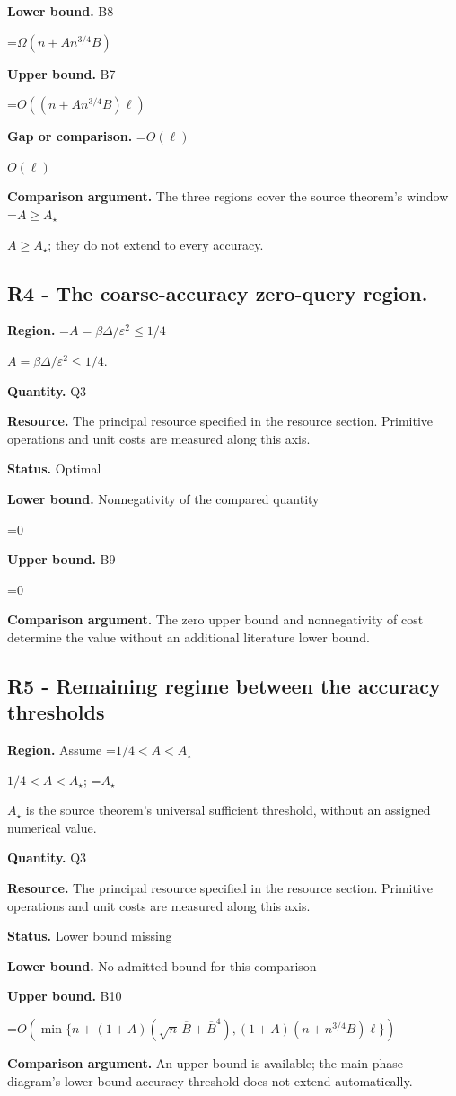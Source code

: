 \documentclass[10pt,a4paper]{article}
\newcommand{\AtlasMath}[1]{\par\begingroup\centering\setbox0=\hbox{$\displaystyle #1$}\ifdim\wd0>1.4\linewidth\typeout{ATLAS WIDE FORMULA: \the\wd0}\fi\ifdim\wd0>\linewidth\resizebox{\linewidth}{!}{\box0}\else\box0\fi\par\endgroup}
\newcommand{\AtlasInlineMath}[1]{\begingroup\setbox0=\hbox{$#1$}\ifdim\wd0>.4\linewidth\endgroup\AtlasMath{#1}\else\endgroup$#1$\fi}
\begin{document}
\textbf{Lower bound.} B8

\AtlasMath{\Omega(n+An^{3/4}B)}
\textbf{Upper bound.} B7

\AtlasMath{O\!\left((n+An^{3/4}B)\ell\right)}
\textbf{Gap or comparison.} \AtlasInlineMath{O(\ell)}

\textbf{Comparison argument.} The three regions cover the source theorem's window \AtlasInlineMath{A\ge A_\star}; they do not extend to every accuracy.

\subsection{R4 - The coarse-accuracy zero-query region.}
\textbf{Region.} \AtlasInlineMath{A=\beta\Delta/\varepsilon^2\le1/4}.

\textbf{Quantity.} Q3

\textbf{Resource.} The principal resource specified in the resource section. Primitive operations and unit costs are measured along this axis.

\textbf{Status.} Optimal

\textbf{Lower bound.} Nonnegativity of the compared quantity

\AtlasMath{0}
\textbf{Upper bound.} B9

\AtlasMath{0}
\textbf{Comparison argument.} The zero upper bound and nonnegativity of cost determine the value without an additional literature lower bound.

\subsection{R5 - Remaining regime between the accuracy thresholds}
\textbf{Region.} Assume \AtlasInlineMath{1/4<A<A_\star}; \AtlasInlineMath{A_\star} is the source theorem's universal sufficient threshold, without an assigned numerical value.

\textbf{Quantity.} Q3

\textbf{Resource.} The principal resource specified in the resource section. Primitive operations and unit costs are measured along this axis.

\textbf{Status.} Lower bound missing

\textbf{Lower bound.} No admitted bound for this comparison

\textbf{Upper bound.} B10

\AtlasMath{O\!\left(\min\{n+(1+A)(\sqrt n\,\overline B+\overline B^4),(1+A)(n+n^{3/4}B)\ell\}\right)}
\textbf{Comparison argument.} An upper bound is available; the main phase diagram's lower-bound accuracy threshold does not extend automatically.
\end{document}
